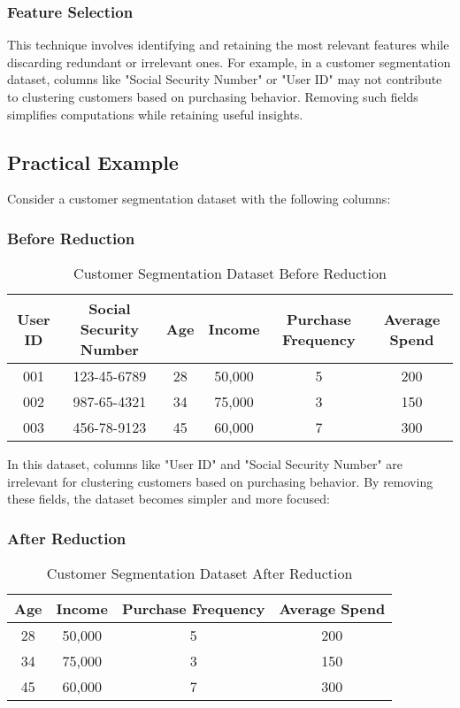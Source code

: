 \documentclass[12pt]{article}
\begin{document}
\subsubsection{Feature Selection}
This technique involves identifying and retaining the most relevant features while discarding redundant or irrelevant ones. For example, in a customer segmentation dataset, columns like "Social Security Number" or "User ID" may not contribute to clustering customers based on purchasing behavior. Removing such fields simplifies computations while retaining useful insights.

\subsection{Practical Example}

Consider a customer segmentation dataset with the following columns:

\subsubsection{Before Reduction}

\begin{table}[h!]
    \centering
    \begin{tabular}{|c|c|c|c|c|c|}
        \hline
        \textbf{User ID} & \textbf{Social Security Number} & \textbf{Age} & \textbf{Income} & \textbf{Purchase Frequency} & \textbf{Average Spend} \\
        \hline
        001 & 123-45-6789 & 28 & 50,000 & 5 & 200 \\
        002 & 987-65-4321 & 34 & 75,000 & 3 & 150 \\
        003 & 456-78-9123 & 45 & 60,000 & 7 & 300 \\
        \hline
    \end{tabular}
    \caption{Customer Segmentation Dataset Before Reduction}
    \label{tab:before_reduction}
\end{table}

In this dataset, columns like "User ID" and "Social Security Number" are irrelevant for clustering customers based on purchasing behavior. By removing these fields, the dataset becomes simpler and more focused:

\subsubsection{After Reduction}

\begin{table}[h!]
    \centering
    \begin{tabular}{|c|c|c|c|}
        \hline
        \textbf{Age} & \textbf{Income} & \textbf{Purchase Frequency} & \textbf{Average Spend} \\
        \hline
        28 & 50,000 & 5 & 200 \\
        34 & 75,000 & 3 & 150 \\
        45 & 60,000 & 7 & 300 \\
        \hline
    \end{tabular}
    \caption{Customer Segmentation Dataset After Reduction}
    \label{tab:after_reduction}
\end{table}
\end{document}

